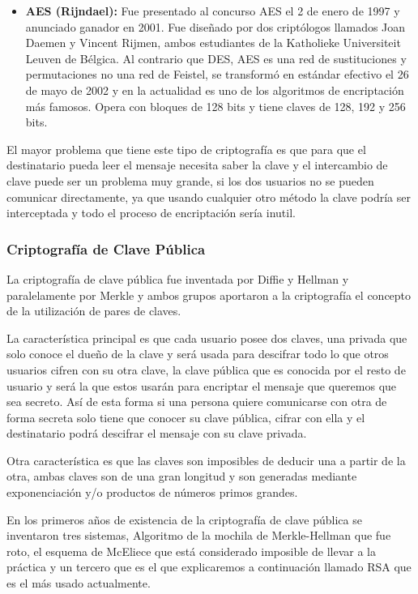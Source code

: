 \begin{itemize}
\item \textbf{AES (Rijndael):} Fue presentado al concurso AES el 2 de enero de 1997 y anunciado ganador en 2001. Fue diseñado por dos criptólogos llamados Joan Daemen y Vincent Rijmen, ambos estudiantes de la Katholieke Universiteit Leuven de Bélgica. Al contrario que DES, AES es una red de sustituciones y permutaciones no una red de Feistel, se transformó en estándar efectivo el 26 de mayo de 2002 y en la actualidad es uno de los algoritmos de encriptación más famosos. Opera con bloques de 128 bits y tiene claves de 128, 192 y 256 bits.

\end{itemize}

El mayor problema que tiene este tipo de criptografía es que para que el destinatario pueda leer el mensaje necesita saber la clave y el intercambio de clave puede ser un problema muy grande, si los dos usuarios no se pueden comunicar directamente, ya que usando cualquier otro método la clave podría ser interceptada y todo el proceso de encriptación sería inutil.

\subsubsection*{Criptografía de Clave Pública}

La criptografía de clave pública fue inventada por Diffie y Hellman y paralelamente por Merkle y ambos grupos aportaron a la criptografía el concepto de la utilización de pares de claves.

La característica principal es que cada usuario posee dos claves, una privada que solo conoce el dueño de la clave y será usada para descifrar todo lo que otros usuarios cifren con su otra clave, la clave pública que es conocida por el resto de usuario y será la que estos usarán para encriptar el mensaje que queremos que sea secreto. Así de esta forma si una persona quiere comunicarse con otra de forma secreta solo tiene que conocer su clave pública, cifrar con ella y el destinatario podrá descifrar el mensaje con su clave privada. 

Otra característica es que las claves son imposibles de deducir una a partir de la otra, ambas claves son de una gran longitud y son generadas mediante exponenciación y/o productos de números primos grandes.

En los primeros años de existencia de la criptografía de clave pública se inventaron tres sistemas, Algoritmo de la mochila de Merkle-Hellman que fue roto, el esquema de McEliece que está considerado imposible de llevar a la práctica y un tercero que es el que explicaremos a continuación llamado RSA que es el más usado actualmente.

